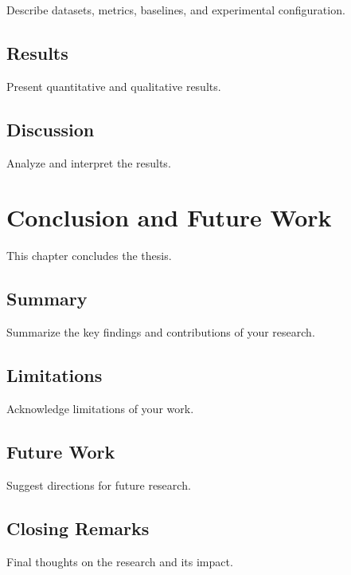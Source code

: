 \documentclass[12pt, oneside]{book}
\theoremstyle{definition}
\theoremstyle{remark}
\begin{document}
Describe datasets, metrics, baselines, and experimental configuration.

\section{Results}
\label{sec:results}

Present quantitative and qualitative results.

\section{Discussion}
\label{sec:discussion}

Analyze and interpret the results.

\chapter{Conclusion and Future Work}
\label{chap:conclusion}

This chapter concludes the thesis.

\section{Summary}
\label{sec:summary}

Summarize the key findings and contributions of your research.

\section{Limitations}
\label{sec:limitations}

Acknowledge limitations of your work.

\section{Future Work}
\label{sec:future}

Suggest directions for future research.

\section{Closing Remarks}
\label{sec:closing}

Final thoughts on the research and its impact.


\backmatter
\end{document}

